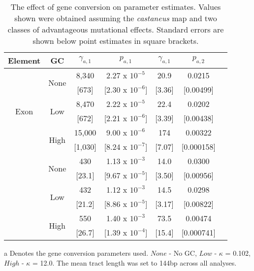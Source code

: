 \begin{table}[H]
   \centering
      \begin{threeparttable}[b]

\caption{The effect of gene conversion on parameter estimates. Values shown were obtained assuming the \textit{castaneus} map and two classes of advantageous mutational effects. Standard errors are shown below point estimates in square brackets.}

\begin{tabular}{ccccccc}

\toprule
Element 		&      GC\tnote{a}  &          $\gamma_{a,1}$ &            $p_{a,1}$ &       $\gamma_{a,1}$ &      $p_{a,2}$ \\
\midrule
   \multirow{6}{*}{Exon} &    \multirow{2}{*}{None} &   8,340&  2.27 x $10^{-5}$ &   20.9&  0.0215\\
             &      &    [673]&  [2.30 x $10^{-6}$]&    [3.36]&  [0.00499]          \\
 	      	 &  \multirow{2}{*}{Low}  &   8,470 &  2.22 x $10^{-5}$ &   22.4&  0.0202\\
             &      &    [672]&  [2.21 x $10^{-6}$]&    [3.39]&  [0.00438]\\
   		     &    \multirow{2}{*}{High}  &  15,000 &  9.00 x $10^{-6}$ &  174&  0.00322\\
             &      &   [1,030] &  [8.24 x $10^{-7}$] &    [7.07] &  [0.000158]          \\ \hdashline
    \multirow{6}{*}{CNE}		 &    \multirow{2}{*}{None}  &    430&  1.13 x $10^{-3}$ &   14.0&  0.0300\\
             &      &     [23.1] &  [9.67 x $10^{-5}$] &    [3.50] &  [0.00956]      \\
     		 &  \multirow{2}{*}{Low}  &    432 &  1.12 x $10^{-3}$ &   14.5&  0.0298\\
             &      &     [21.2]&  [8.86 x $10^{-5}$] &    [3.17] &  [0.00822]\\
     		&    \multirow{2}{*}{High}  &    550 &  1.40 x $10^{-3}$ &   73.5&  0.00474          \\
            &      &     [26.7] &  [1.39 x $10^{-4}$] &   [15.4] &  [0.000741]          \\
\bottomrule
\end{tabular}

   \begin{tablenotes}
     \item[a] Denotes the gene conversion parameters used. $None$ - No GC, $Low$ - $\kappa$ = 0.102, $High$ - $\kappa$ = 12.0. The mean tract length was set to 144bp across all analyses.
   \end{tablenotes}
  \label{tab:GeneConversion}

    \end{threeparttable}

\end{table}